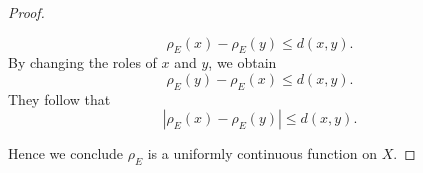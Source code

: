\begin{Exercise}
\begin{enumerate}[(a)]
\begin{proof}
\begin{enumerate}
				$$
				\rho_E(x) - \rho_E(y) \leq d(x,y).
				$$
				By changing the roles of $x$ and $y$, we obtain
				$$
				\rho_E(y) - \rho_E(x) \leq d(x,y).
				$$
				They follow that
				$$
				\left| \rho_E(x) - \rho_E(y) \right| \leq d(x,y).
				$$
			\end{enumerate}
			Hence we conclude $\rho_E$ is a uniformly continuous function on $X$.
		\end{proof}
	\end{enumerate}
\end{Exercise}